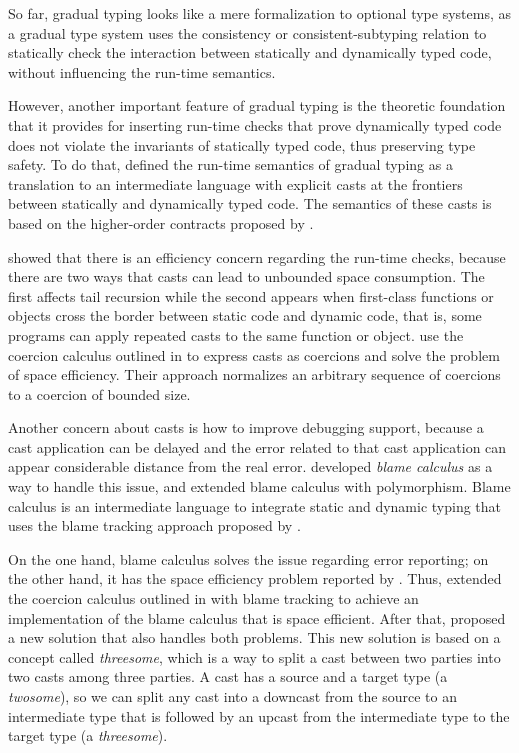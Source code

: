 So far, gradual typing looks like a mere formalization to optional
type systems, as a gradual type system uses the consistency or
consistent-subtyping relation to statically check the interaction
between statically and dynamically typed code, without influencing
the run-time semantics.

However, another important feature of gradual typing is the theoretic
foundation that it provides for inserting run-time checks that
prove dynamically typed code does not violate the invariants of
statically typed code, thus preserving type safety.
To do that, \citet{siek2006gradual,siek2007objects} defined the
run-time semantics of gradual typing as a translation to an
intermediate language with explicit casts at the frontiers between
statically and dynamically typed code.
The semantics of these casts is based on the higher-order contracts
proposed by \citet{findler2002chf}.

\citet{herman2007sgt} showed that there is an efficiency
concern regarding the run-time checks, because there are two
ways that casts can lead to unbounded space consumption.
The first affects tail recursion while the second appears when
first-class functions or objects cross the border between
static code and dynamic code, that is, some programs can apply
repeated casts to the same function or object.
\citet{herman2007sgt} use the coercion calculus outlined in
\citet{henglein1994dts} to express casts as coercions and
solve the problem of space efficiency.
Their approach normalizes an arbitrary sequence of coercions to a
coercion of bounded size.

Another concern about casts is how to improve debugging support,
because a cast application can be delayed and the error related
to that cast application can appear considerable distance
from the real error.
\citet{wadler2009wpc} developed \emph{blame calculus} as a way
to handle this issue, and \citet{ahmed2011bfa} extended
blame calculus with polymorphism.
Blame calculus is an intermediate language to integrate
static and dynamic typing that uses the blame tracking approach
proposed by \citet{findler2002chf}.

On the one hand, blame calculus solves the issue regarding
error reporting;
on the other hand, it has the space efficiency problem reported
by \citet{herman2007sgt}.
Thus, \citet{siek2009casts} extended the coercion calculus outlined in
\citet{herman2007sgt} with blame tracking to achieve an
implementation of the blame calculus that is space efficient.
After that, \citet{siek2010blame} proposed a new solution that also
handles both problems.
This new solution is based on a concept called \emph{threesome},
which is a way to split a cast between two parties into two casts
among three parties.
A cast has a source and a target type (a \emph{twosome}),
so we can split any cast into a downcast from the source to an
intermediate type that is followed by an upcast from the intermediate
type to the target type (a \emph{threesome}).

